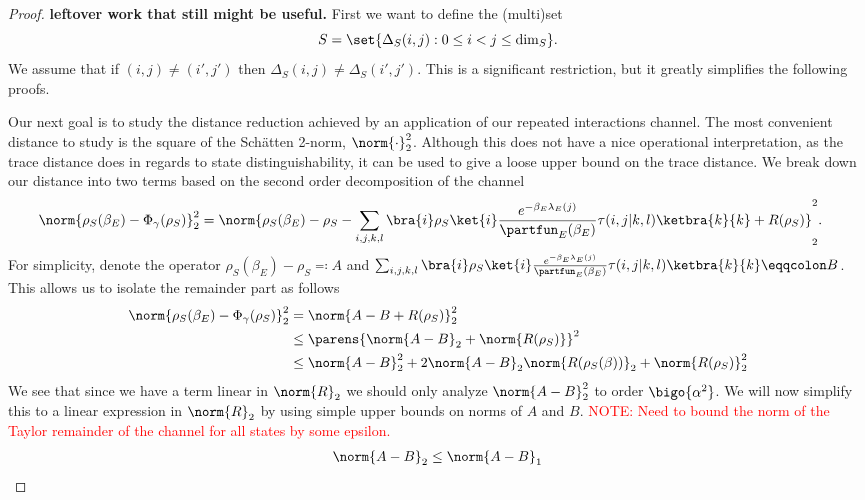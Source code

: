 \begin{proof}
    \textbf{leftover work that still might be useful.}
        First we want to define the (multi)set
        \begin{equation}
            S = \set{\Delta_S(i,j) : 0 \leq i < j \leq \dim_S}.
        \end{equation}
        We assume that if $(i,j) \neq (i', j')$ then $\Delta_S(i,j) \neq \Delta_S(i', j')$. This is a significant restriction, but it greatly simplifies the following proofs. 
        
        Our next goal is to study the distance reduction achieved by an application of our repeated interactions channel. The most convenient distance to study is the square of the Sch\"{a}tten 2-norm, $\norm{\cdot}_2^2$. Although this does not have a nice operational interpretation, as the trace distance does in regards to state distinguishability, it can be used to give a loose upper bound on the trace distance. We break down our distance into two terms based on the second order decomposition of the channel
    \begin{align}
        \norm{\rho_S(\beta_E) - \Phi_{\gamma}(\rho_S)}_2^2 &= \norm{\rho_S(\beta_E) - \rho_S - \sum_{i, j, k, l} \bra{i} \rho_S \ket{i} \frac{e^{-\beta_E \lambda_E(j)}}{\partfun_E(\beta_E)}   \tau(i, j| k,l) \ketbra{k}{k} + R(\rho_S)}_2^2.
    \end{align}
    For simplicity, denote the operator $\rho_S(\beta_E) - \rho_S \eqqcolon A$ and $\sum_{i, j, k, l} \bra{i} \rho_S \ket{i} \frac{e^{-\beta_E \lambda_E(j)}}{\partfun_E(\beta_E)} \tau(i, j| k,l) \ketbra{k}{k} \eqqcolon B$. This allows us to isolate the remainder part as follows
    \begin{align}
        \norm{\rho_S(\beta_E) - \Phi_\gamma(\rho_S)}_2^2 &= \norm{A - B + R(\rho_S)}_2^2 \\
        &\leq \parens{\norm{A - B}_2 + \norm{R(\rho_S)}}^2 \\
        &\leq \norm{A - B}_2^2 + 2 \norm{A - B}_2 \norm{R(\rho_S(\beta))}_2 + \norm{R(\rho_S)}_2^2
    \end{align}
    We see that since we have a term linear in $\norm{R}_2$ we should only analyze $\norm{A - B}_2^2$ to order $\bigo{\alpha^2}$. We will now simplify this to a linear expression in $\norm{R}_2$ by using simple upper bounds on norms of $A$ and $B$. \textcolor{red}{NOTE: Need to bound the norm of the Taylor remainder of the channel for all states by some epsilon.} 
    \begin{align}
        \norm{A - B}_2 &\leq \norm{A - B}_1 \\

\end{align}
\end{proof}
